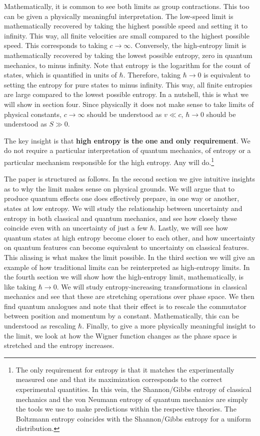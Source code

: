 \documentclass{article}
\begin{document}
Mathematically, it is common to see both limits as group contractions. This too can be given a physically meaningful interpretation. The low-speed limit is mathematically recovered by taking the highest possible speed and setting it to infinity. This way, all finite velocities are small compared to the highest possible speed. This corresponds to taking $c \to \infty$. Conversely, the high-entropy limit is mathematically recovered by taking the lowest possible entropy, zero in quantum mechanics, to minus infinity. Note that entropy is the logarithm for the count of states, which is quantified in units of $\hbar$. Therefore, taking $\hbar \to 0$ is equivalent to setting the entropy for pure states to minus infinity. This way, all finite entropies are large compared to the lowest possible entropy. In a nutshell, this is what we will show in section four. Since physically it does not make sense to take limits of physical constants, $c \to \infty$ should be understood as $v \ll c$, $\hbar \to 0$ should be understood as $S \gg 0$.

The key insight is that \textbf{high entropy is the one and only requirement}. We do not require a particular interpretation of quantum mechanics, of entropy or a particular mechanism responsible for the high entropy. Any will do.\footnote{The only requirement for entropy is that it matches the experimentally measured one and that its maximization corresponds to the correct experimental quantities. In this vein, the Shannon/Gibbs entropy of classical mechanics and the von Neumann entropy of quantum mechanics are simply the tools we use to make predictions within the respective theories. The Boltzmann entropy coincides with the Shannon/Gibbs entropy for a uniform distribution. }

The paper is structured as follows. In the second section we give intuitive insights as to why the limit makes sense on physical grounds. We will argue that to produce quantum effects one does effectively prepare, in one way or another, states at low entropy. We will study the relationship between uncertainty and entropy in both classical and quantum mechanics, and see how closely these coincide even with an uncertainty of just a few $\hbar$. Lastly, we will see how quantum states at high entropy become closer to each other, and how uncertainty on quantum features can become equivalent to uncertainty on classical features. This aliasing is what makes the limit possible. In the third section we will give an example of how traditional limits can be reinterpreted as high-entropy limits. In the fourth section we will show how the high-entropy limit, mathematically, is like taking $\hbar \to 0$. We will study entropy-increasing transformations in classical mechanics and see that these are stretching operations over phase space. We then find quantum analogues and note that their effect is to rescale the commutator between position and momentum by a constant. Mathematically, this can be understood as rescaling $\hbar$. Finally, to give a more physically meaningful insight to the limit, we look at how the Wigner function changes as the phase space is stretched and the entropy increases.
\end{document}
